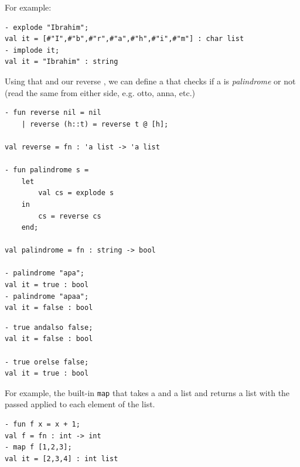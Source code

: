 For example:
\begin{verbatim}
- explode "Ibrahim";
val it = [#"I",#"b",#"r",#"a",#"h",#"i",#"m"] : char list
- implode it;
val it = "Ibrahim" : string
\end{verbatim}

Using that and our reverse , we can define a  that checks if a  is \textit{palindrome} or not (read the same from either side, e.g. otto, anna, etc.)
\begin{verbatim}
- fun reverse nil = nil
    | reverse (h::t) = reverse t @ [h];

val reverse = fn : 'a list -> 'a list

- fun palindrome s = 
    let 
        val cs = explode s 
    in 
        cs = reverse cs 
    end;

val palindrome = fn : string -> bool

- palindrome "apa";
val it = true : bool
- palindrome "apaa";
val it = false : bool
\end{verbatim}

\begin{verbatim}
- true andalso false;
val it = false : bool

- true orelse false;
val it = true : bool
\end{verbatim}


For example, the built-in  \texttt{map} that takes a  and a list and returns a list with the passed  applied to each element of the list.
\begin{verbatim}
- fun f x = x + 1;
val f = fn : int -> int
- map f [1,2,3];
val it = [2,3,4] : int list
\end{verbatim}

